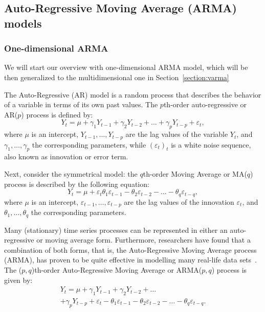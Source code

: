 \documentclass[conference,letterpaper]{IEEEtran}
\renewcommand\epsilon{\varepsilon}
\begin{document}
\label{section:genericmodels}
\subsection{Auto-Regressive Moving Average (ARMA) models}
\subsubsection{One-dimensional ARMA}
We will start our overview with one-dimensional ARMA model, which will be then generalized to the multidimensional one in Section~\ref{section:varma}

The Auto-Regressive (AR) model is a random process that describes the behavior of a variable in terms of its own past values. The $p$th-order auto-regressive or AR($p$) process is defined by:
\begin{equation*}
Y_t = \mu + \gamma_1Y_{t-1} + \gamma_2Y_{t-2} + \hdots + \gamma_pY_{t-p} + \epsilon_t,
\end{equation*}
where $\mu$ is an intercept, $Y_{t-1},\hdots,Y_{t-p}$ are the lag values of the variable $Y_t$, and $\gamma_1,\hdots,\gamma_p$ the corresponding parameters,
while $(\epsilon_t)_t$ is a white noise sequence, also known as innovation or error term.

Next, consider the symmetrical model: the $q$th-order Moving Average or MA($q$) process is described by the following equation:
\begin{equation*}
Y_t = \mu + \epsilon_t \theta_1\epsilon_{t-1} - \theta_2\epsilon_{t-2} - \hdots - \theta_q\epsilon_{t-q},
\end{equation*}
where $\mu$ is an intercept, $\epsilon_{t-1},\hdots,\epsilon_{t-p}$ are the lag values of the innovation $\epsilon_t$, and $\theta_1,\hdots,\theta_q$ the corresponding parameters. 

Many (stationary) time series processes can be represented in either an auto-regressive or moving average form. Furthermore, researchers have found that a combination of both forms, that is, the Auto-Regressive Moving Average process (ARMA), has proven to be quite effective in modelling many real-life data sets~\cite{BORCDAV2009}. The ($p,q$)th-order Auto-Regressive Moving Average or ARMA($p,q$) process is given by:
\begin{eqnarray*}
Y_t = \mu + \gamma_1Y_{t-1} + \gamma_2Y_{t-2} + \hdots \\
+ \gamma_pY_{t-p} + \epsilon_t - \theta_1\epsilon_{t-1} - \theta_2\epsilon_{t-2} - \hdots - \theta_q\epsilon_{t-q}.
\end{eqnarray*}
\end{document}

